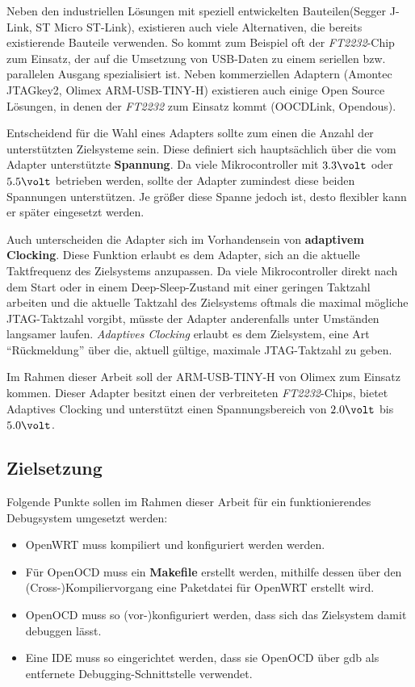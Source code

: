 Neben den industriellen Lösungen mit speziell entwickelten Bauteilen(Segger
J-Link, ST Micro ST-Link), existieren auch viele Alternativen, die bereits
existierende Bauteile verwenden. So kommt zum Beispiel oft der
\emph{FT2232}-Chip zum Einsatz, der auf die Umsetzung von USB-Daten zu einem
seriellen bzw. parallelen Ausgang spezialisiert ist. Neben kommerziellen
Adaptern (Amontec JTAGkey2, Olimex ARM-USB-TINY-H) existieren auch einige Open
Source Lösungen, in denen der \emph{FT2232} zum Einsatz kommt (OOCDLink,
Opendous). 

Entscheidend für die Wahl eines Adapters sollte zum einen die Anzahl der
unterstützten Zielsysteme sein. Diese definiert sich hauptsächlich über die
vom Adapter unterstützte \textbf{Spannung}. Da viele Mikrocontroller mit
$3.3\volt$ oder $5.5\volt$ betrieben werden, sollte der Adapter zumindest diese beiden
Spannungen unterstützen. Je größer diese Spanne jedoch ist, desto flexibler kann
er später eingesetzt werden.

Auch unterscheiden die Adapter sich im Vorhandensein von \textbf{adaptivem
Clocking}. Diese Funktion erlaubt es dem Adapter, sich an die aktuelle
Taktfrequenz des Zielsystems anzupassen. Da viele Mikrocontroller direkt nach
dem Start oder in einem Deep-Sleep-Zustand mit einer geringen Taktzahl arbeiten
und die aktuelle Taktzahl des Zielsystems oftmals die maximal mögliche
JTAG-Taktzahl vorgibt, müsste der Adapter anderenfalls unter Umständen langsamer
laufen. \emph{Adaptives Clocking} erlaubt es dem Zielsystem, eine Art
"`Rückmeldung"' über die, aktuell gültige, maximale JTAG-Taktzahl zu geben.

Im Rahmen dieser Arbeit soll der ARM-USB-TINY-H von Olimex zum Einsatz kommen.
Dieser Adapter besitzt einen der verbreiteten \emph{FT2232}-Chips, bietet
Adaptives Clocking und unterstützt einen Spannungsbereich von $2.0\volt$ bis
$5.0\volt$.

\subsection{Zielsetzung}
Folgende Punkte sollen im Rahmen dieser Arbeit für ein funktionierendes
Debugsystem umgesetzt werden:
\begin{itemize}
  \item OpenWRT muss kompiliert und konfiguriert werden werden.
  \item Für OpenOCD muss ein \textbf{Makefile} erstellt werden, mithilfe
  dessen über den \linebreak(Cross-)Kompiliervorgang eine Paketdatei für
  OpenWRT erstellt wird.
  \item OpenOCD muss so (vor-)konfiguriert werden, dass sich das Zielsystem
  damit debuggen lässt.
  \item Eine IDE muss so eingerichtet werden, dass sie OpenOCD über \gls{gdb}
  als entfernete Debugging-Schnittstelle verwendet.
\end{itemize}
